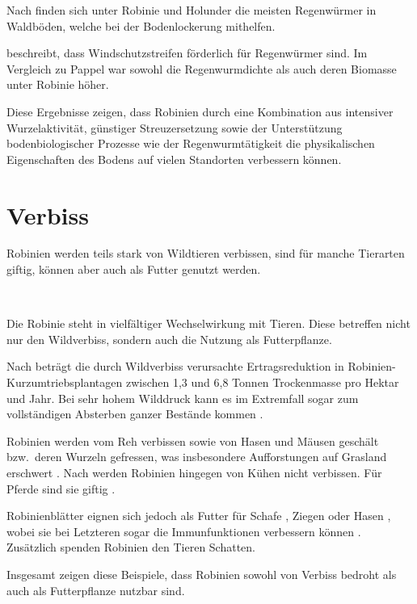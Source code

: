 \documentclass[twocolumn]{scrartcl}
\makeatletter
\newcommand{\summary}[1]{%
  \par %
  {\small\sffamily
    \noindent #1\par}
  \vspace{-0.4em}
  \noindent\makebox[\linewidth]{\rule{0.33\linewidth}{0.4pt}}\\[-1.2em]
  \@afterindentfalse\@afterheading
}
\makeatother
\begin{document}
Nach \citet{bluemke1955robinie} finden sich unter Robinie und Holunder die meisten Regenwürmer in Waldböden, welche bei der Bodenlockerung mithelfen.

\citet{vaupel2023robinie} beschreibt, dass Windschutzstreifen förderlich für Regenwürmer sind. Im Vergleich zu Pappel war sowohl die Regenwurmdichte als auch deren Biomasse unter Robinie höher.

Diese Ergebnisse zeigen, dass Robinien durch eine Kombination aus intensiver Wurzelaktivität, günstiger Streuzersetzung sowie der Unterstützung bodenbiologischer Prozesse wie der Regenwurmtätigkeit die physikalischen Eigenschaften des Bodens auf vielen Standorten verbessern können.


\section{Verbiss}

\summary{Robinien werden teils stark von Wildtieren verbissen, sind
  für manche Tierarten giftig, können aber auch als Futter genutzt
  werden.}

Die Robinie steht in vielfältiger Wechselwirkung mit Tieren. Diese betreffen nicht nur den Wildverbiss, sondern auch die Nutzung als Futterpflanze.

Nach \citet{landgraf2014immenser} beträgt die durch Wildverbiss verursachte Ertragsreduktion in Robinien-Kurzumtriebsplantagen zwischen 1{,}3 und 6{,}8 Tonnen Trockenmasse pro Hektar und Jahr. Bei sehr hohem Wilddruck kann es im Extremfall sogar zum vollständigen Absterben ganzer Bestände kommen \citep{landgraf2024robinie1,landgraf2024robinie2}.

Robinien werden vom Reh verbissen sowie von Hasen und Mäusen geschält bzw.\ deren Wurzeln gefressen, was insbesondere Aufforstungen auf Grasland erschwert \citep{barta2023robinieReh}. Nach \citet{berner2018robinie} werden Robinien hingegen von Kühen nicht verbissen. Für Pferde sind sie giftig \citep{grosche2008robiniePferd}.

Robinienblätter eignen sich jedoch als Futter für Schafe \citep{ganai2009robnieSchaf}, Ziegen \citep{papachristou1999robinieZiege} oder Hasen \citep{singh2010robnieHasennahrung}, wobei sie bei Letzteren sogar die Immunfunktionen verbessern können \citep{yang2017robinieHasen}. Zusätzlich spenden Robinien den Tieren Schatten.

Insgesamt zeigen diese Beispiele, dass Robinien sowohl von Verbiss bedroht als auch als Futterpflanze nutzbar sind.
\end{document}
